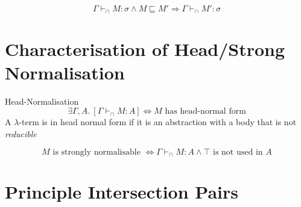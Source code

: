 \[\Gamma \vdash_\cap M : \sigma \land M \sqsubseteq M' \Rightarrow \Gamma \vdash_\cap M' : \sigma\]

\section{Characterisation of Head/Strong Normalisation}
\begin{definitionbox}{Head-Normalisation}
    \[\exists \Gamma, A . \ [\Gamma \vdash_\cap M : A] \Leftrightarrow M \text{ has head-normal form}\]
    A $\lambda$-term is in head normal form if it is an abstraction with a body that is not \textit{reducible}
\end{definitionbox}
\[M \text{ is strongly normalisable } \Leftrightarrow \Gamma \vdash_\cap M : A \land \top \text{ is not used in } A\]

\section{Principle Intersection Pairs}
\unfinished
